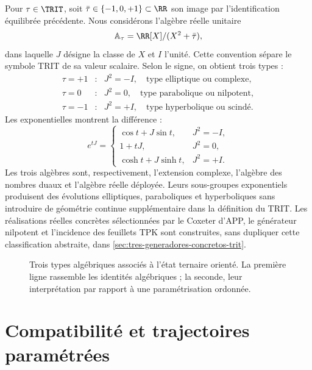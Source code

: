 Pour \(\tau\in\TRIT\), soit \(\bar\tau\in\{-1,0,+1\}\subset\RR\) son
image par l'identification équilibrée précédente. Nous considérons l'algèbre réelle
unitaire
\[
\mathbb A_\tau=\RR[X]/(X^2+\bar\tau),
\]
dans laquelle \(J\) désigne la classe de \(X\) et \(I\) l'unité. Cette convention
sépare le symbole TRIT de sa valeur scalaire.
Selon le signe, on obtient trois types :
\[
\begin{array}{ccl}
\tau=+1&:&J^2=-I,\quad\text{type elliptique ou complexe},\\
\tau=0&:&J^2=0,\quad\text{type parabolique ou nilpotent},\\
\tau=-1&:&J^2=+I,\quad\text{type hyperbolique ou scindé}.
\end{array}
\]
Les exponentielles montrent la différence :
\[
e^{tJ}=
\begin{cases}
\cos t+J\sin t,&J^2=-I,\\
1+tJ,&J^2=0,\\
\cosh t+J\sinh t,&J^2=+I.
\end{cases}
\]
Les trois algèbres sont, respectivement, l'extension complexe, l'algèbre des
nombres duaux et l'algèbre réelle déployée. Leurs sous-groupes exponentiels
produisent des évolutions elliptiques, paraboliques et hyperboliques sans introduire de
géométrie continue supplémentaire dans la définition du TRIT\@.
Les réalisations réelles concrètes sélectionnées par le Coxeter d'APP, le
générateur nilpotent et l'incidence des feuillets TPK sont construites, sans
dupliquer cette classification abstraite, dans
\cref{sec:tres-generadores-concretos-trit}.

\begin{figure}[H]
\centering
\resizebox{\textwidth}{!}{}
\caption{Trois types algébriques associés à l'état ternaire orienté. La
première ligne rassemble les identités algébriques ; la seconde, leur interprétation
par rapport à une paramétrisation ordonnée.}
\label{fig:trit-atlas}
\end{figure}

\section{Compatibilité et trajectoires paramétrées}

